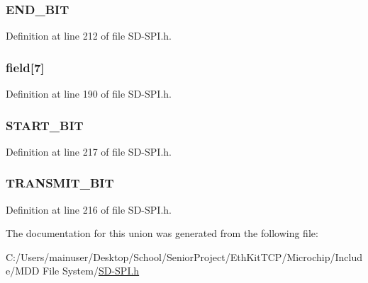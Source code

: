 \subsubsection[{E\+N\+D\+\_\+\+B\+I\+T}]{ E\+N\+D\+\_\+\+B\+I\+T}\label{union_c_m_d___p_a_c_k_e_t_a1ba6e89b8f1b747c60404b3b56d57e2d}


Definition at line 212 of file S\+D-\/\+S\+P\+I.\+h.

\hypertarget{union_c_m_d___p_a_c_k_e_t_a7665cb13e055b8ccbcd4976534124abe}{}
\subsubsection[{field}]{ field\mbox{[}7\mbox{]}}\label{union_c_m_d___p_a_c_k_e_t_a7665cb13e055b8ccbcd4976534124abe}


Definition at line 190 of file S\+D-\/\+S\+P\+I.\+h.

\hypertarget{union_c_m_d___p_a_c_k_e_t_aa98be881f92e7f78989c1d8adc1e755b}{}
\subsubsection[{S\+T\+A\+R\+T\+\_\+\+B\+I\+T}]{ S\+T\+A\+R\+T\+\_\+\+B\+I\+T}\label{union_c_m_d___p_a_c_k_e_t_aa98be881f92e7f78989c1d8adc1e755b}


Definition at line 217 of file S\+D-\/\+S\+P\+I.\+h.

\hypertarget{union_c_m_d___p_a_c_k_e_t_a3964c021590a119b76c058b64d02b63c}{}
\subsubsection[{T\+R\+A\+N\+S\+M\+I\+T\+\_\+\+B\+I\+T}]{ T\+R\+A\+N\+S\+M\+I\+T\+\_\+\+B\+I\+T}\label{union_c_m_d___p_a_c_k_e_t_a3964c021590a119b76c058b64d02b63c}


Definition at line 216 of file S\+D-\/\+S\+P\+I.\+h.



The documentation for this union was generated from the following file\+:\begin{DoxyCompactItemize}
\item 
C\+:/\+Users/mainuser/\+Desktop/\+School/\+Senior\+Project/\+Eth\+Kit\+T\+C\+P/\+Microchip/\+Include/\+M\+D\+D File System/\hyperlink{_s_d-_s_p_i_8h}{S\+D-\/\+S\+P\+I.\+h}\end{DoxyCompactItemize}
